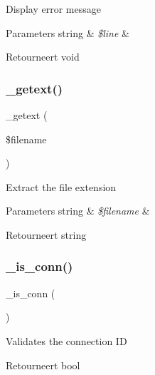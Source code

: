 Display error message


\begin{DoxyParams}[1]{Parameters}
string & {\em \$line} & \\
\hline
\end{DoxyParams}
\begin{DoxyReturn}{Retourneert}
void 
\end{DoxyReturn}
\mbox{\label{class_c_i___f_t_p_ab06ef33f96f03cafbb8f2bb6d695ef1f}} 
\subsubsection{\texorpdfstring{\_getext()}{\_getext()}}
{\footnotesize\ttfamily \+\_\+getext (\begin{DoxyParamCaption}\item[{}]{\$filename }\end{DoxyParamCaption})\hspace{0.3cm}{\ttfamily [protected]}}

Extract the file extension


\begin{DoxyParams}[1]{Parameters}
string & {\em \$filename} & \\
\hline
\end{DoxyParams}
\begin{DoxyReturn}{Retourneert}
string 
\end{DoxyReturn}
\mbox{\label{class_c_i___f_t_p_af20c08e4b61fe028e032b388cd73936a}} 
\subsubsection{\texorpdfstring{\_is\_conn()}{\_is\_conn()}}
{\footnotesize\ttfamily \+\_\+is\+\_\+conn (\begin{DoxyParamCaption}{ }\end{DoxyParamCaption})\hspace{0.3cm}{\ttfamily [protected]}}

Validates the connection ID

\begin{DoxyReturn}{Retourneert}
bool 
\end{DoxyReturn}
\mbox{\label{class_c_i___f_t_p_a95562e7b8a41561f4b0b525d9c7fe701}} 
